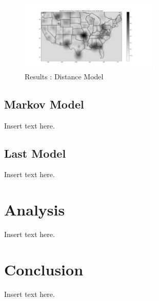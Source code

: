 \documentclass[twoside,twocolumn]{article}
\begin{document}
\begin{figure}[h!] %
\centering %
\includegraphics[width=0.6\textwidth]{Euclidean_Graph1} %
\caption{Results : Distance Model} %
\label{fig:Results1}
\end{figure}


\subsection{Markov Model}
Insert text here.

\subsection{Last Model}
Insert text here.

\section{Analysis}
\label{sec:analysis}
Insert text here.

\section{Conclusion}
\label{sec:conclusion}
Insert text here.
\end{document}
